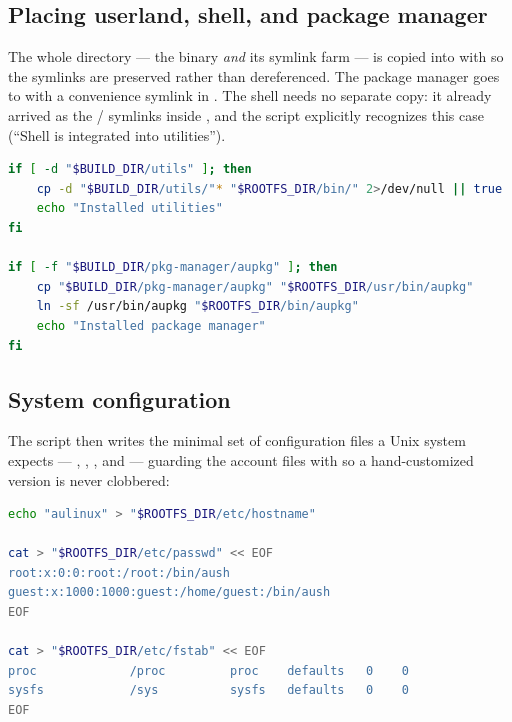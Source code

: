 \subsection{Placing userland, shell, and package manager}

The whole  directory --- the  binary
\emph{and} its symlink farm --- is copied into  with 
so the symlinks are preserved rather than dereferenced. The package manager
goes to  with a convenience symlink in . The
shell needs no separate copy: it already arrived as the /
symlinks inside , and the script explicitly recognizes this
case (``Shell is integrated into utilities'').

\begin{lstlisting}[language=bash, caption={make\_rootfs.sh --- installing utils (symlink-preserving) and aupkg}]
if [ -d "$BUILD_DIR/utils" ]; then
    cp -d "$BUILD_DIR/utils/"* "$ROOTFS_DIR/bin/" 2>/dev/null || true
    echo "Installed utilities"
fi

if [ -f "$BUILD_DIR/pkg-manager/aupkg" ]; then
    cp "$BUILD_DIR/pkg-manager/aupkg" "$ROOTFS_DIR/usr/bin/aupkg"
    ln -sf /usr/bin/aupkg "$ROOTFS_DIR/bin/aupkg"
    echo "Installed package manager"
fi
\end{lstlisting}

\subsection{System configuration}

The script then writes the minimal set of configuration files a Unix system
expects --- , , , and
 --- guarding the account files with \code{[ ! -f ... ]} so a
hand-customized version is never clobbered:

\begin{lstlisting}[language=bash, caption={make\_rootfs.sh --- baseline accounts and mount table}]
echo "aulinux" > "$ROOTFS_DIR/etc/hostname"

cat > "$ROOTFS_DIR/etc/passwd" << EOF
root:x:0:0:root:/root:/bin/aush
guest:x:1000:1000:guest:/home/guest:/bin/aush
EOF

cat > "$ROOTFS_DIR/etc/fstab" << EOF
proc             /proc         proc    defaults   0    0
sysfs            /sys          sysfs   defaults   0    0
EOF
\end{lstlisting}

